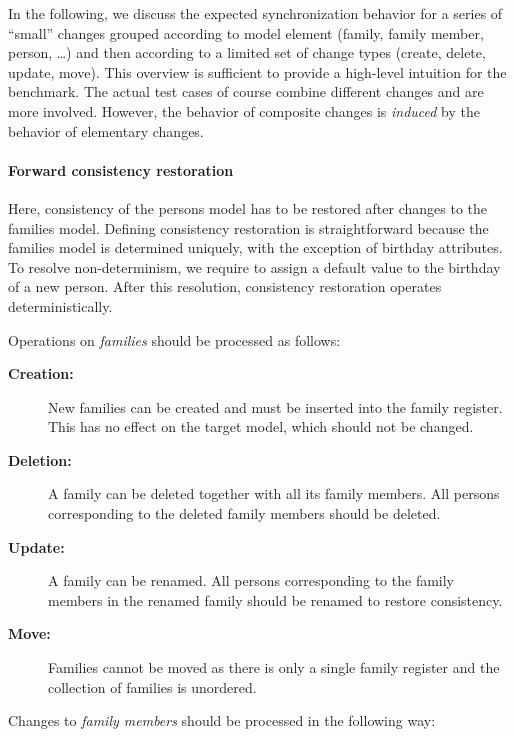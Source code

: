 In the following, we discuss the expected synchronization behavior for a series of ``small'' changes grouped according to model element (family, family member, person, \ldots) and then according to a limited set of change types (create, delete, update, move).
This overview is sufficient to provide a high-level intuition for the benchmark.
The actual test cases of course combine different changes and are more involved. However, the behavior of composite changes is \emph{induced} by the behavior of elementary changes.

\paragraph{Forward consistency restoration}

Here, consistency of the persons model has to be restored after changes to the families model. Defining consistency restoration is straightforward because the families model is determined uniquely, with the exception of birthday attributes. To resolve non-determinism, we require to assign a default value to the birthday of a new person. After this resolution, consistency restoration operates deterministically.

Operations on \emph{families} should be processed as follows:

\begin{description}
    \item[\textbf{Creation:}]
    New families can be created and must be inserted into the family register.
    This has no effect on the target model, which should not be changed.
    
    \item[\textbf{Deletion:}]
    A family can be deleted together with all its family members.
    All persons corresponding to the deleted family members should be deleted.
    
    \item[\textbf{Update:}]
    A family can be renamed.  All persons corresponding to the family members in the renamed family should be renamed to restore consistency.
    
    \item[\textbf{Move:}]
    Families cannot be moved as there is only a single family register and the collection of families is unordered.
\end{description}


Changes to \emph{family members} should be processed in the following way: 

